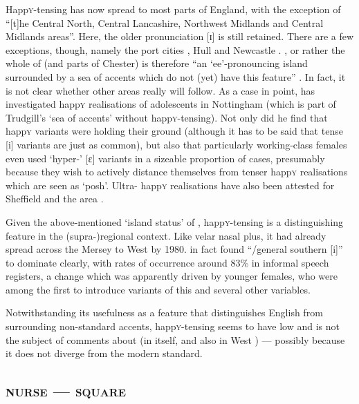 Happ\textsc{y}-tensing has now spread to most parts of England, with the exception of ``[t]he Central North, Central Lancashire, Northwest Midlands and Central Midlands areas''.
Here, the older pronunciation [ɪ] is still retained.
There are a few exceptions, though, namely the port cities , Hull and Newcastle \citep[cf.][62]{trudgill1999}.
, or rather the whole of  (and parts of Chester) is therefore ``an `ee'-pronouncing island surrounded by a sea of accents which do not (yet) have this feature'' \citep[72]{trudgill1999}.
In fact, it is not clear whether other areas really will follow.
As a case in point, \textcite{flynn2010} has investigated happ\textsc{y} realisations of adolescents in Nottingham (which is part of Trudgill's `sea of accents' without happ\textsc{y}-tensing).
Not only did he find that  happ\textsc{y} variants were holding their ground (although it has to be said that tense [i] variants are just as common), but also that particularly working-class females even used `hyper-' [ɛ] variants in a sizeable proportion of cases, presumably because they wish to actively distance themselves from tenser happ\textsc{y} realisations which are seen as `posh'.
Ultra- happ\textsc{y} realisations have also been attested for Sheffield \parencite{stoddartetal1999} and the  area \parencite{watts2006}.

Given the above-mentioned `island status' of , happ\textsc{y}-tensing is a distinguishing feature in the (supra-)regional context.
Like velar nasal plus, it had already spread across the Mersey to West  by 1980.
\textcite[97 and 99]{newbrook1999} in fact found ``/general southern [i]'' to dominate clearly, with rates of occurrence around 83\% in informal speech registers, a change which was apparently driven by younger females, who were among the first to introduce  variants of this and several other variables.

Notwithstanding its usefulness as a feature that distinguishes  English from surrounding non-standard accents, happ\textsc{y}-tensing seems to have low  and is not the subject of comments about  (in  itself, and also in West ) --- possibly because it does not diverge from the modern standard.

		\subsection{\textsc{nurse} --- \textsc{square}}\label{sec.var.vow.nurse}

